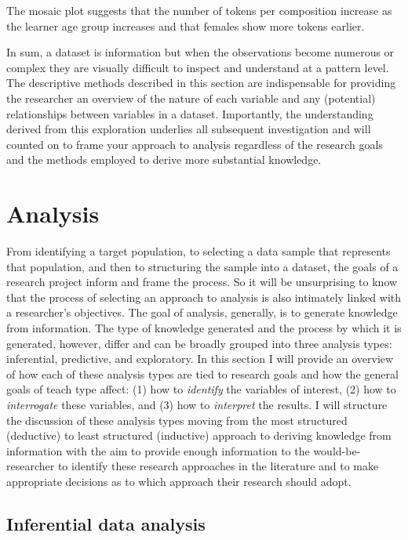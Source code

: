 \documentclass[
  letterpaper,
]{latex/krantz}
\begin{document}
The mosaic plot suggests that the number of tokens per composition
increase as the learner age group increases and that females show more
tokens earlier.

In sum, a dataset is information but when the observations become
numerous or complex they are visually difficult to inspect and
understand at a pattern level. The descriptive methods described in this
section are indispensable for providing the researcher an overview of
the nature of each variable and any (potential) relationships between
variables in a dataset. Importantly, the understanding derived from this
exploration underlies all subsequent investigation and will counted on
to frame your approach to analysis regardless of the research goals and
the methods employed to derive more substantial knowledge.

\hypertarget{analysis}{%
\section{Analysis}\label{analysis}}

From identifying a target population, to selecting a data sample that
represents that population, and then to structuring the sample into a
dataset, the goals of a research project inform and frame the process.
So it will be unsurprising to know that the process of selecting an
approach to analysis is also intimately linked with a researcher's
objectives. The goal of analysis, generally, is to generate knowledge
from information. The type of knowledge generated and the process by
which it is generated, however, differ and can be broadly grouped into
three analysis types: inferential, predictive, and exploratory. In this
section I will provide an overview of how each of these analysis types
are tied to research goals and how the general goals of teach type
affect: (1) how to \emph{identify} the variables of interest, (2) how to
\emph{interrogate} these variables, and (3) how to \emph{interpret} the
results. I will structure the discussion of these analysis types moving
from the most structured (deductive) to least structured (inductive)
approach to deriving knowledge from information with the aim to provide
enough information to the would-be-researcher to identify these research
approaches in the literature and to make appropriate decisions as to
which approach their research should adopt.

\hypertarget{inferential-data-analysis}{%
\subsection{Inferential data analysis}\label{inferential-data-analysis}}
\end{document}
